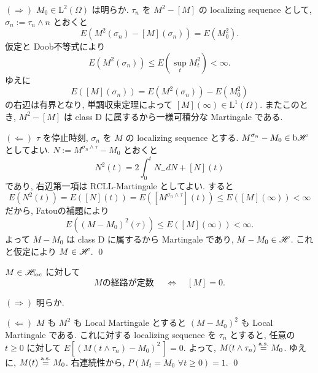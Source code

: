 \documentclass{ltjsarticle}
\begin{document}
\begin{prf}
	\( ( \Rightarrow ) \)
	\( M_0 \in \mathrm{L}^2 ( \Omega ) \) は明らか.
	\( \tau_n \) を \( M^2 - [ M ] \)
	の localizing sequence として, 
	\( \sigma_n := \tau_n \wedge n \)
	とおくと
	\[
		E \left( M^2 ( \sigma_n ) - [ M ]( \sigma_n ) \right) = E \left(M^2_0 \right).
	\]
	仮定と Doob不等式により
	\[
		E \left( M^2 ( \sigma_n ) \right) \le E \left( \sup_t M^2_t \right) < \infty.
	\]
	ゆえに
	\[
		E \left([ M ]( \sigma_n ) \right) 
		= E \left( M^2 ( \sigma_n ) \right) - E \left(M^2_0 \right)
	\]
	の右辺は有界となり, 単調収束定理によって \( [M] ( \infty ) \in \mathrm{L}^1 ( \Omega ) \).
	またこのとき, \( M^2 - [ M ] \) は class D に属するから一様可積分な Martingale である.
	
	\( ( \Leftarrow ) \)
	\( \tau \) を停止時刻,
	\( \sigma_n \) を \( M \) の localizing sequence とする.
	\( M_{-}^{ \sigma_n } - M_0 \in \mathrm{b}\mathscr{H} \)
	としてよい.
	\( N := M^{ \sigma_n \wedge \tau } - M_0 \) とおくと
	\[
		N^2(t) = 2 \int_0^t N_{-} dN + [N](t)
	\]
	であり, 右辺第一項は RCLL-Martingale としてよい.
	すると
	\[
		E \left( N^2(t) \right) = E \left( [N](t) \right) 
		= E \left( [M^{ \sigma_n \wedge \tau }] (t) \right)
		\le E \left( [M](\infty) \right) < \infty
	\]
	だから, Fatouの補題により
	\[
		E \left( \left( M - M_0 \right)^2 ( \tau ) \right) 
		\le E \left( [M](\infty) \right) < \infty.
	\]
	よって \( M - M_0 \) は class D に属するから Martingale であり, \( M - M_0 \in \mathscr{H} \).
	これと仮定により \( M \in \mathscr{H} \).
	\qed\end{prf}	%

\begin{prp}	\label{characterazation of trivial QV}
	\( M \in \mathscr{H}_{\mathrm{loc}} \) に対して
	\[
		M\textit{の経路が定数 }
		\quad \Leftrightarrow \quad
		[M] = 0.
	\]
\end{prp}
\begin{prf}
	\( ( \Rightarrow ) \) 明らか.
	
	\( ( \Leftarrow ) \)
	\( M \) も \( M^2 \) も Local Martingale とすると \( ( M - M_0 )^2 \) も Local Martingale である.
	これに対する localizing sequence を \( \tau_n \) とすると, 任意の \( t \ge 0 \) に対して
	\( E \left[ \left( M( t \wedge \tau_n) - M_0 \right)^2 \, \right] = 0 \).
	よって,
	\( M( t \wedge \tau_n) \stackrel{ \text{a.s.} }{ = } M_0 \).
	ゆえに,
	\( M( t ) \stackrel{ \text{a.s.} }{ = } M_0 \).
	右連続性から,
	\( P(M_t = M_0 \,\, \forall t \ge 0 ) =1 \).
	\qed\end{prf}
\end{document}
